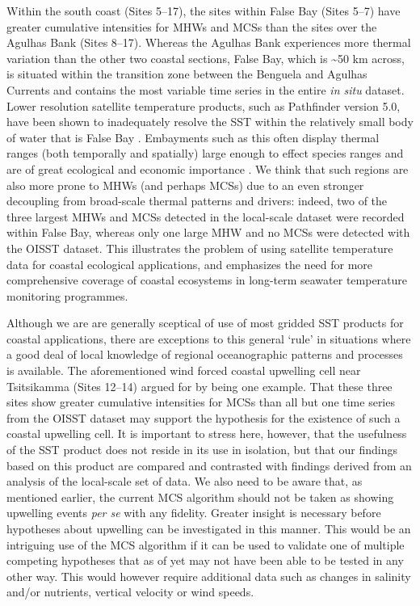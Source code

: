 \documentclass[a4paper,10pt,review]{elsarticle}
\begin{document}
Within the south coast (Sites 5--17), the sites within False Bay (Sites 5--7) have greater cumulative intensities for MHWs and MCSs than the sites over the Agulhas Bank (Sites 8--17). Whereas the Agulhas Bank experiences more thermal variation than the other two coastal sections, False Bay, which is \textasciitilde50 km across, is situated within the transition zone between the Benguela and Agulhas Currents \citep{Smit2013} and contains the most variable time series in the entire \emph{in situ} dataset. Lower resolution satellite temperature products, such as Pathfinder version 5.0, have been shown to inadequately resolve the SST within the relatively small body of water that is False Bay \citep{Dufois2012}. Embayments such as this often display thermal ranges (both temporally and spatially) large enough to effect species ranges \citep{Ling2009} and are of great ecological \citep{Klumb2003} and economic importance \citep{Lugendo2005}. We think that such regions are also more prone to MHWs (and perhaps MCSs) due to an even stronger decoupling from broad-scale thermal patterns and drivers: indeed, two of the three largest MHWs and MCSs detected in the local-scale dataset were recorded within False Bay, whereas only one large MHW and no MCSs were detected with the OISST dataset. This illustrates the problem of using satellite temperature data for coastal ecological applications, and emphasizes the need for more comprehensive coverage of coastal ecosystems in long-term seawater temperature monitoring programmes.

Although we are are generally sceptical of use of most gridded SST products for coastal applications, there are exceptions to this general `rule' in situations where a good deal of local knowledge of regional oceanographic patterns and processes is available. The aforementioned wind forced coastal upwelling cell near Tsitsikamma (Sites 12--14) argued for by \citet{Roberts2005} being one example. That these three sites show greater cumulative intensities for MCSs than all but one time series from the OISST dataset may support the hypothesis for the existence of such a coastal upwelling cell. It is important to stress here, however, that the usefulness of the SST product does not reside in its use in isolation, but that our findings based on this product are compared and contrasted with findings derived from an analysis of the local-scale set of data. We also need to be aware that, as mentioned earlier, the current MCS algorithm should not be taken as showing upwelling events \emph{per se} with any fidelity. Greater insight is necessary before hypotheses about upwelling can be investigated in this manner. This would be an intriguing use of the MCS algorithm if it can be used to validate one of multiple competing hypotheses that as of yet may not have been able to be tested in any other way. This would however require additional data such as changes in salinity and/or nutrients, vertical velocity or wind speeds.
\end{document}
